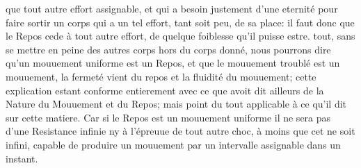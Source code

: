 que tout autre effort assignable, et qui a besoin justement d'une eternit\'{e} pour faire sortir un corps qui a un tel effort, tant soit peu, de sa place: il faut donc que le Repos cede \`{a} tout autre effort, de quelque foiblesse qu'il puisse estre.  tout, sans se mettre en peine des autres corps hors du corps donn\'{e}, nous pourrons dire qu'un mouuement uniforme est un Repos, et que le  mouuement troubl\'{e} est un mouuement,  la fermet\'{e} vient du repos et la fluidit\'{e} du mouuement; cette explication estant conforme entierement avec ce que \protect{} avoit dit ailleurs de la Nature du Mouuement et du Repos; mais point du tout applicable \`{a} ce qu'il dit sur cette matiere. Car si le Repos est un mouuement\protect{}  uniforme il ne sera pas d'une Resistance infinie ny \`{a} l'\'{e}preuue de tout autre choc, \`{a} moins que cet  ne soit infini, capable de produire un mouuement par un intervalle assignable dans un instant.
\pend